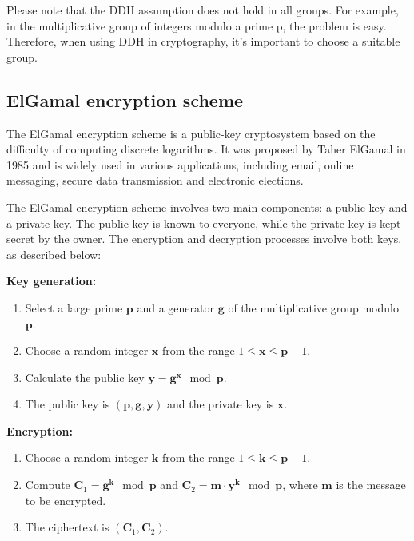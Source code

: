 Please note that the DDH assumption does not hold in all groups. For example, in the multiplicative group of integers modulo a prime p, the problem is easy. Therefore, when using DDH in cryptography, it's important to choose a suitable group.


\subsection{ElGamal encryption scheme}
The ElGamal encryption scheme is a public-key cryptosystem based on the difficulty of computing discrete logarithms. It was proposed by Taher ElGamal in 1985 \cite{ElGamal:1985} and is widely used in various applications, including email, online messaging, secure data transmission and electronic elections.

The ElGamal encryption scheme involves two main components: a public key and a private key. The public key is known to everyone, while the private key is kept secret by the owner. The encryption and decryption processes involve both keys, as described below:

\textbf{Key generation:}

\begin{enumerate}
    \item Select a large prime $\boldsymbol{p}$ and a generator $\boldsymbol{g}$ of the multiplicative group modulo~$\boldsymbol{p}$.
    \item Choose a random integer $\boldsymbol{x}$ from the range $1 \leq \boldsymbol{x} \leq \boldsymbol{p}-1$.
    \item Calculate the public key $\boldsymbol{y} = \boldsymbol{g} ^ {\boldsymbol{x}} \mod \boldsymbol{p}$.
    \item The public key is $(\boldsymbol{p}, \boldsymbol{g}, \boldsymbol{y})$ and the private key is $\boldsymbol{x}$.
\end{enumerate}

\textbf{Encryption:}

\begin{enumerate}
    \item Choose a random integer $\boldsymbol{k}$ from the range $1 \leq {\boldsymbol{k}} \leq {\boldsymbol{p}}-1$.
    \item Compute $\boldsymbol{C}_1 = {\boldsymbol{g}}^{\boldsymbol{k}} \mod {\boldsymbol{p}}$ and $\boldsymbol{C}_2 = {\boldsymbol{m}} \cdot {\boldsymbol{y}}^{\boldsymbol{k}} \mod {\boldsymbol{p}}$, where ${\boldsymbol{m}}$ is the message to be encrypted.
    \item The ciphertext is $({\boldsymbol{C}}_1, {\boldsymbol{C}}_2)$.
\end{enumerate}

